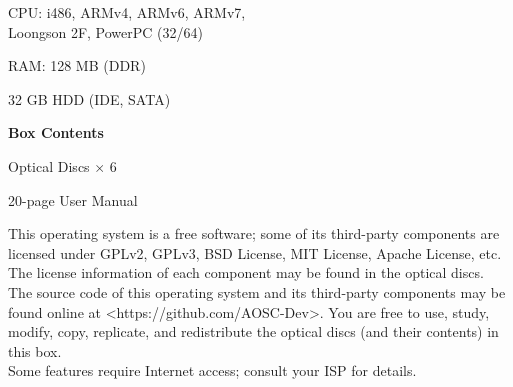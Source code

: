            \vspace{15pt}
            {\large\bfseries \tHardwareRequirements}\vspace{4pt}
            \begin{compactitem}
                \sffamily
                \item CPU: i486, ARMv4, ARMv6, ARMv7,\\
                    Loongson 2F, PowerPC (32/64)
                \item RAM: 128 MB (DDR)
                \item 32 GB HDD (IDE, SATA)
            \end{compactitem}

            \vspace{15pt}
            {\large\bfseries Box Contents}\vspace{4pt}
            \begin{compactitem}
                \sffamily
                \item Optical Discs $\times$ 6
                \item 20-page User Manual
            \end{compactitem}

            \vspace{10pt}

    \vfill
    
    \sffamily\small
    This operating system is a free software;
    some of its third-party components are licensed under GPLv2, GPLv3, BSD License, MIT License, Apache License, etc.
    The license information of each component may be found in the optical discs.
    The source code of this operating system and its third-party components
    may be found online at <https://github.com/AOSC-Dev>.
    You are free to use, study, modify, copy, replicate, and redistribute the optical discs (and their contents) in this box.\\
    Some features require Internet access; consult your ISP for details.
